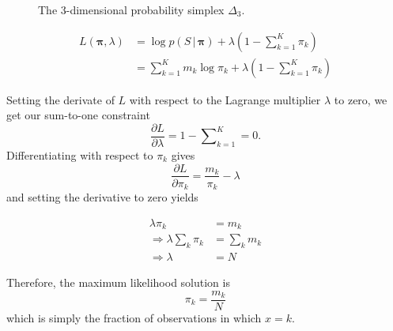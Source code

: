 \documentclass[final,3p,times,twocolumn]{elsarticle}
\let\bs\boldsymbol
\begin{document}
\begin{figure}
\caption{The 3-dimensional probability simplex $\Delta_3$.}
\label{fig:simplex}
\end{figure}

\begin{equation}
\label{eqn:catlagrange}
\begin{split}
L(\bs \pi, \lambda) &= \log p(S\,|\,\bs \pi) + \lambda\left(1 - \sum \nolimits_{k=1}^K \pi_k\right)\\
&= \sum\nolimits_{k=1}^K m_k \log \pi_k + \lambda\left(1-\sum\nolimits_{k=1}^K \pi_k\right)
\end{split}
\end{equation}

Setting the derivate of $L$ with respect to the Lagrange multiplier $\lambda$ to zero, we get our sum-to-one constraint
\begin{equation}
\label{dldlambda}
\frac{\partial L}{\partial \lambda} = 1 - \sum\nolimits_{k=1}^K = 0.
\end{equation}
Differentiating with respect to $\pi_k$ gives
\begin{equation}
\frac{\partial L}{\partial \pi_k} = \frac{m_k}{\pi_k} - \lambda
\end{equation}
and setting the derivative to zero yields

\begin{equation}
\label{dldpi}
\begin{split}
\lambda \pi_k &= m_k\\
\Rightarrow \lambda \sum\nolimits_k \pi_k &= \sum\nolimits_k m_k\\
\Rightarrow \lambda &= N
\end{split}
\end{equation}

Therefore, the maximum likelihood solution is 
\begin{equation}
\label{eqn:catML}
\pi_k = \frac{m_k}{N}
\end{equation}
which is simply the fraction of observations in which $x = k$.
\end{document}
